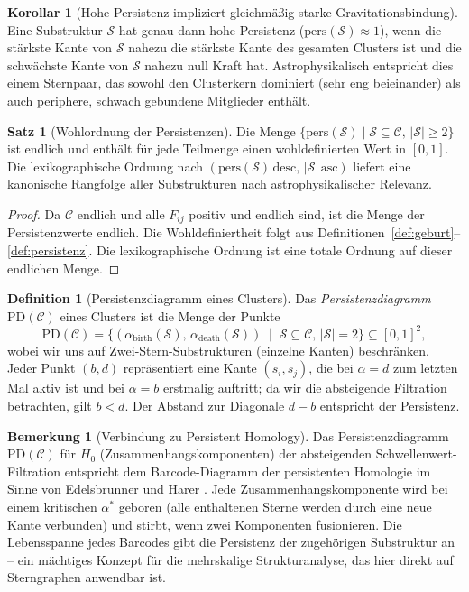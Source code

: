 ﻿\documentclass[a4paper,12pt]{report}
\theoremstyle{definition}
\newtheorem{definition}{Definition}
\newtheorem{satz}{Satz}
\newtheorem{bemerkung}{Bemerkung}
\newtheorem{korollar}{Korollar}
\begin{document}
\begin{korollar}[Hohe Persistenz impliziert gleichmäßig starke Gravitationsbindung]
\label{kor:persistenz}
Eine Substruktur $\mathcal{S}$ hat genau dann hohe Persistenz ($\mathrm{pers}(\mathcal{S}) \approx 1$), wenn die stärkste Kante von $\mathcal{S}$ nahezu die stärkste Kante des gesamten Clusters ist und die schwächste Kante von $\mathcal{S}$ nahezu null Kraft hat. Astrophysikalisch entspricht dies einem Sternpaar, das sowohl den Clusterkern dominiert (sehr eng beieinander) als auch periphere, schwach gebundene Mitglieder enthält.
\end{korollar}

\begin{satz}[Wohlordnung der Persistenzen]
\label{satz:wohlordnung}
Die Menge $\{\mathrm{pers}(\mathcal{S}) \mid \mathcal{S} \subseteq \mathcal{C},\, |\mathcal{S}| \geq 2\}$ ist endlich und enthält für jede Teilmenge einen wohldefinierten Wert in $[0,1]$. Die lexikographische Ordnung nach $(\mathrm{pers}(\mathcal{S})\, \text{desc},\, |\mathcal{S}|\, \text{asc})$ liefert eine kanonische Rangfolge aller Substrukturen nach astrophysikalischer Relevanz.
\end{satz}

\begin{proof}
Da $\mathcal{C}$ endlich und alle $F_{ij}$ positiv und endlich sind, ist die Menge der Persistenzwerte endlich. Die Wohldefiniertheit folgt aus Definitionen~\ref{def:geburt}--\ref{def:persistenz}. Die lexikographische Ordnung ist eine totale Ordnung auf dieser endlichen Menge.
\end{proof}

\begin{definition}[Persistenzdiagramm eines Clusters]
\label{def:persistenzdiagramm}
Das \emph{Persistenzdiagramm} $\mathrm{PD}(\mathcal{C})$ eines Clusters ist die Menge der Punkte
\[
\mathrm{PD}(\mathcal{C}) = \bigl\{(\alpha_\mathrm{birth}(\mathcal{S}),\, \alpha_\mathrm{death}(\mathcal{S})) \;\mid\; \mathcal{S} \subseteq \mathcal{C},\, |\mathcal{S}| = 2\bigr\}
\subseteq [0,1]^2,
\]
wobei wir uns auf Zwei-Stern-Substrukturen (einzelne Kanten) beschränken. Jeder Punkt $(b, d)$ repräsentiert eine Kante $(s_i, s_j)$, die bei $\alpha = d$ zum letzten Mal aktiv ist und bei $\alpha = b$ erstmalig auftritt; da wir die absteigende Filtration betrachten, gilt $b < d$. Der Abstand zur Diagonale $d - b$ entspricht der Persistenz.
\end{definition}

\begin{bemerkung}[Verbindung zu Persistent Homology]
Das Persistenzdiagramm $\mathrm{PD}(\mathcal{C})$ für $H_0$ (Zusammenhangskomponenten) der absteigenden Schwellenwert-Filtration entspricht dem Barcode-Diagramm der persistenten Homologie im Sinne von Edelsbrunner und Harer \cite{edelsbrunner2010}. Jede Zusammenhangskomponente wird bei einem kritischen $\alpha^*$ geboren (alle enthaltenen Sterne werden durch eine neue Kante verbunden) und stirbt, wenn zwei Komponenten fusionieren. Die Lebensspanne jedes Barcodes gibt die Persistenz der zugehörigen Substruktur an -- ein mächtiges Konzept für die mehrskalige Strukturanalyse, das hier direkt auf Sterngraphen anwendbar ist.
\end{bemerkung}
\end{document}
